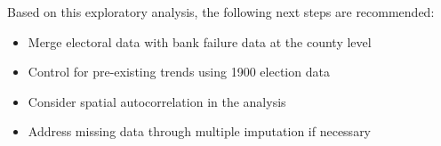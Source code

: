 \documentclass[11pt]{article}
\begin{document}
Based on this exploratory analysis, the following next steps are recommended:

\begin{itemize}
    \item Merge electoral data with bank failure data at the county level
    \item Control for pre-existing trends using 1900 election data
    \item Consider spatial autocorrelation in the analysis
    \item Address missing data through multiple imputation if necessary
\end{itemize}


% 
% 
\end{document}
